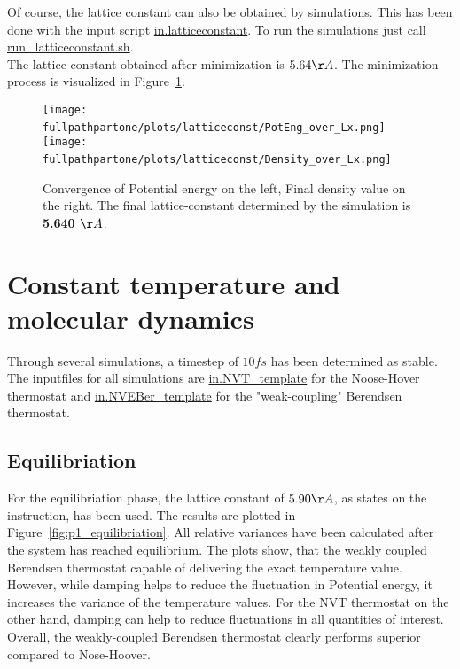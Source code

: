 \documentclass[10pt,a4paper]{report}
\def \pathpartone {../../1_three-dimensional_atomic_system}
\def \fullpathpartone {/home/lukas/Desktop/project/independence/atomistic_modeling/exam/1_three-dimensional_atomic_system}
\begin{document}
Of course, the lattice constant can also be obtained by simulations. This has been done with the input script \href{../../DIR1/in.latticeconstant}{in.latticeconstant}. To run the simulations just call \href{../../DIR1/run_latticeconstant.sh}{run\_latticeconstant.sh}.\\
The lattice-constant obtained after minimization is $5.64 \AA$. The minimization process is visualized in Figure~\ref{fig:p1_latticeconst}.

\begin{center}
\begin{figure}[h]
\texttt{[image: \\fullpathpartone/plots/latticeconst/PotEng\_over\_Lx.png]}~
\texttt{[image: \\fullpathpartone/plots/latticeconst/Density\_over\_Lx.png]}~
\caption[aa]{Convergence of Potential energy on the left, Final density value on the right. The final lattice-constant determined by the simulation is \textbf{5.640 $\AA$}. }
\label{fig:p1_latticeconst}
\end{figure}
\end{center}


\section{Constant temperature and molecular dynamics}
Through several simulations, a timestep of $10 fs$ has been determined as stable. The inputfiles for all simulations are \href{\pathpartone/in.NVT_template}{in.NVT\_template} for the Noose-Hover thermostat and \href{\pathpartone/in.NVEBer_template}{in.NVEBer\_template} for the "weak-coupling" Berendsen thermostat.

\subsection{Equilibriation}
For the equilibriation phase, the lattice constant of $5.90 \AA$, as states on the instruction, has been used. The results are plotted in Figure~\ref{fig:p1_equilibriation}. All relative variances have been calculated after the system has reached equilibrium. The plots show, that the weakly coupled Berendsen thermostat capable of delivering the exact temperature value. However, while damping helps to reduce the fluctuation in Potential energy, it increases the variance of the temperature values. For the NVT thermostat on the other hand, damping can help to reduce fluctuations in all quantities of interest.\\
Overall, the weakly-coupled Berendsen thermostat clearly performs superior compared to Nose-Hoover.
\end{document}
